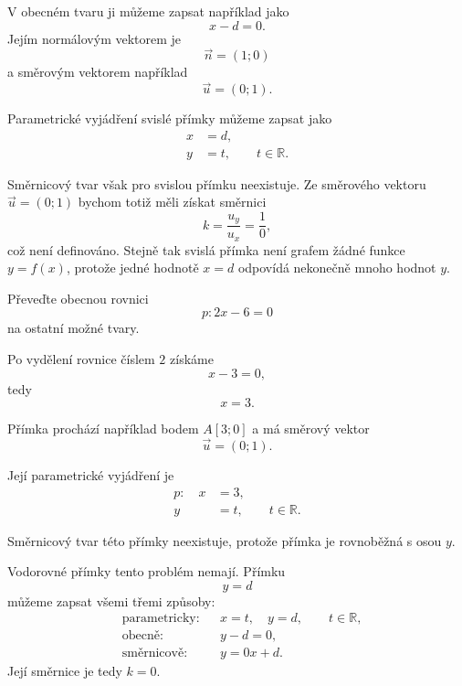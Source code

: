 V obecném tvaru ji můžeme zapsat například jako
\[
    x-d=0.
\]
Jejím normálovým vektorem je
\[
    \vec{n}=(1;0)
\]
a směrovým vektorem například
\[
    \vec{u}=(0;1).
\]

Parametrické vyjádření svislé přímky můžeme zapsat jako
\begin{equation}\label{eq:Vertical_line_parametric_conversion}
    \begin{aligned}
        x&=d,\\
        y&=t,
        \qquad t\in\mathbb{R}.
    \end{aligned}
\end{equation}

Směrnicový tvar však pro svislou přímku neexistuje. Ze směrového
vektoru $\vec{u}=(0;1)$ bychom totiž měli získat směrnici
\[
    k=\frac{u_y}{u_x}=\frac{1}{0},
\]
což není definováno. Stejně tak svislá přímka není grafem žádné funkce
$y=f(x)$, protože jedné hodnotě $x=d$ odpovídá nekonečně mnoho hodnot
$y$.

\begin{example}\label{exa:Vertical_line_conversion}
    Převeďte obecnou rovnici
    \[
        p:2x-6=0
    \]
    na ostatní možné tvary.

    Po vydělení rovnice číslem $2$ získáme
    \[
        x-3=0,
    \]
    tedy
    \[
        x=3.
    \]

    Přímka prochází například bodem $A[3;0]$ a má směrový vektor
    \[
        \vec{u}=(0;1).
    \]

    Její parametrické vyjádření je
    \[
        \begin{aligned}
            p:\quad x&=3,\\
                     y&=t,
                     \qquad t\in\mathbb{R}.
        \end{aligned}
    \]

    Směrnicový tvar této přímky neexistuje, protože přímka je
    rovnoběžná s osou $y$.
\end{example}

\begin{remark}\label{rem:Horizontal_line_all_forms}
    Vodorovné přímky tento problém nemají. Přímku
    \[
        y=d
    \]
    můžeme zapsat všemi třemi způsoby:
    \[
        \begin{aligned}
            &\text{parametricky:}
            &&
            x=t,\quad y=d,
            \qquad t\in\mathbb{R},\\
            &\text{obecně:}
            &&
            y-d=0,\\
            &\text{směrnicově:}
            &&
            y=0x+d.
        \end{aligned}
    \]
    Její směrnice je tedy $k=0$.
\end{remark}

